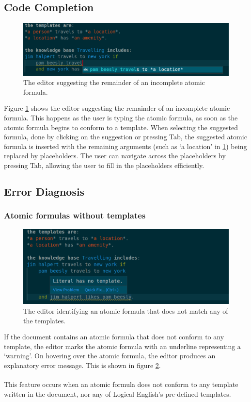 \documentclass[../main.tex]{subfiles}
\begin{document}
\subsection{Code Completion}\begin{figure}[h!]
\centering
\includegraphics[width = \linewidth]{./figures/auto-suggest.png}
\caption{The editor suggesting the remainder of an incomplete atomic formula.}
\label{fig:code-completion}
\end{figure}
Figure \ref{fig:code-completion} shows the editor suggesting the remainder of an incomplete atomic formula. This happens as the user is typing the atomic formula, as soon as the atomic formula begins to conform to a template. When selecting the suggested formula, done by clicking on the suggestion or pressing Tab, the suggested atomic formula is inserted with the remaining arguments (such as `a location' in \ref{fig:code-completion}) being replaced by placeholders. The user can navigate across the placeholders by pressing Tab, allowing the user to fill in the placeholders efficiently.

\subsection{Error Diagnosis}
\subsubsection{Atomic formulas without templates}
\label{section:no-template-feature}
\begin{figure}[h!]
\centering
\includegraphics[width = \linewidth]{./figures/literal-wo-template.png}
\caption{The editor identifying an atomic formula that does not match any of the templates.}
\label{fig:no-template-diag}
\end{figure}
If the document contains an atomic formula that does not conform to any template, the editor marks the atomic formula with an underline representing a `warning'. On hovering over the atomic formula, the editor produces an explanatory error message. This is shown in figure \ref{fig:no-template-diag}.
\\ 
\\
This feature occurs when an atomic formula does not conform to any template written in the document, nor any of Logical English's pre-defined templates.
\end{document}
